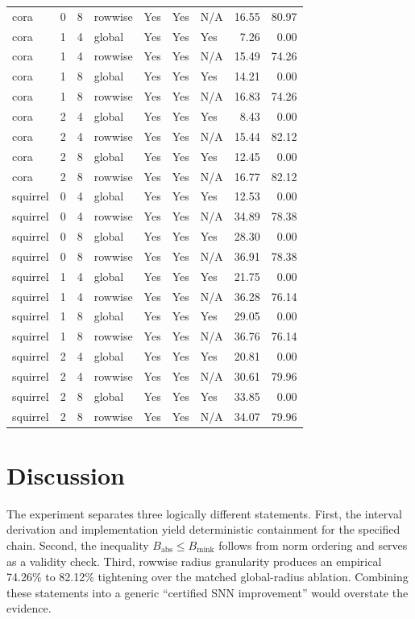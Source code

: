 \documentclass{article}
\begin{document}
\begin{table}[ht]
{\begin{tabular}{lrrllllrr}
cora & 0 & 8 & rowwise & Yes & Yes & N/A & 16.55 & 80.97 \\
cora & 1 & 4 & global & Yes & Yes & Yes & 7.26 & 0.00 \\
cora & 1 & 4 & rowwise & Yes & Yes & N/A & 15.49 & 74.26 \\
cora & 1 & 8 & global & Yes & Yes & Yes & 14.21 & 0.00 \\
cora & 1 & 8 & rowwise & Yes & Yes & N/A & 16.83 & 74.26 \\
cora & 2 & 4 & global & Yes & Yes & Yes & 8.43 & 0.00 \\
cora & 2 & 4 & rowwise & Yes & Yes & N/A & 15.44 & 82.12 \\
cora & 2 & 8 & global & Yes & Yes & Yes & 12.45 & 0.00 \\
cora & 2 & 8 & rowwise & Yes & Yes & N/A & 16.77 & 82.12 \\
squirrel & 0 & 4 & global & Yes & Yes & Yes & 12.53 & 0.00 \\
squirrel & 0 & 4 & rowwise & Yes & Yes & N/A & 34.89 & 78.38 \\
squirrel & 0 & 8 & global & Yes & Yes & Yes & 28.30 & 0.00 \\
squirrel & 0 & 8 & rowwise & Yes & Yes & N/A & 36.91 & 78.38 \\
squirrel & 1 & 4 & global & Yes & Yes & Yes & 21.75 & 0.00 \\
squirrel & 1 & 4 & rowwise & Yes & Yes & N/A & 36.28 & 76.14 \\
squirrel & 1 & 8 & global & Yes & Yes & Yes & 29.05 & 0.00 \\
squirrel & 1 & 8 & rowwise & Yes & Yes & N/A & 36.76 & 76.14 \\
squirrel & 2 & 4 & global & Yes & Yes & Yes & 20.81 & 0.00 \\
squirrel & 2 & 4 & rowwise & Yes & Yes & N/A & 30.61 & 79.96 \\
squirrel & 2 & 8 & global & Yes & Yes & Yes & 33.85 & 0.00 \\
squirrel & 2 & 8 & rowwise & Yes & Yes & N/A & 34.07 & 79.96 \\
\bottomrule
\end{tabular}
}
\end{table}

\section{Discussion}


The experiment separates three logically different statements. First, the interval derivation and implementation yield deterministic containment for the specified chain. Second, the inequality \(B_{\mathrm{abs}}\le B_{\mathrm{mink}}\) follows from norm ordering and serves as a validity check. Third, rowwise radius granularity produces an empirical 74.26\% to 82.12\% tightening over the matched global-radius ablation. Combining these statements into a generic ``certified SNN improvement'' would overstate the evidence.
\end{document}
